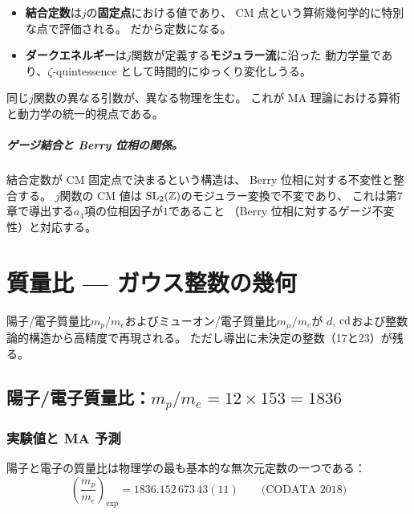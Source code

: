 \begin{itemize}
\item \textbf{結合定数}は$j$の\textbf{固定点}における値であり、
  CM 点という算術幾何学的に特別な点で評価される。
  だから定数になる。
\item \textbf{ダークエネルギー}は$j$関数が定義する\textbf{モジュラー流}に沿った
  動力学量であり、$\zeta$-quintessence として時間的にゆっくり変化しうる。
\end{itemize}

同じ$j$関数の異なる引数が、異なる物理を生む。
これが MA 理論における算術と動力学の統一的視点である。

\paragraph{ゲージ結合と Berry 位相の関係。}
結合定数が CM 固定点で決まるという構造は、
Berry 位相に対する不変性と整合する。
$j$関数の CM 値は $\mathrm{SL}_2(\mathbb{Z})$のモジュラー変換で不変であり、
これは第7章で導出する$a_4$項の位相因子が$1$であること
（Berry 位相に対するゲージ不変性）と対応する。

\chapter{質量比 — ガウス整数の幾何}
\label{ch:mass-ratios}

\begin{statusbox}
陽子/電子質量比$m_p/m_e$およびミューオン/電子質量比$m_\mu/m_e$が
$d$, $\operatorname{cd}$および整数論的構造から高精度で再現される。
ただし導出に未決定の整数（17と23）が残る。
\end{statusbox}

\section{陽子/電子質量比：$m_p/m_e = 12 \times 153 = 1836$}
\label{sec:proton-electron}

\subsection{実験値と MA 予測}

陽子と電子の質量比は物理学の最も基本的な無次元定数の一つである：
\begin{equation}
\left(\frac{m_p}{m_e}\right)_{\!\text{exp}} = 1836.152\,673\,43(11)
\qquad\text{(CODATA 2018)}
\end{equation}

